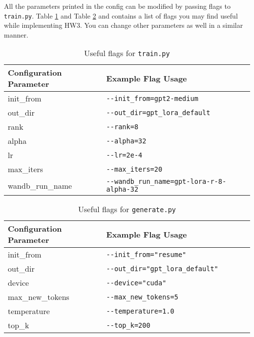 \documentclass[11pt,addpoints,answers]{exam}
\begin{document}
\begin{questions}
\begin{enumerate}
    
    
    

\end{enumerate}


All the parameters printed in the config can be modified by passing flags to \lstinline{train.py}. Table \ref{table:flag1} and Table \ref{table:flag2} and contains a list of flags you may find useful while implementing HW3. You can change other parameters as well in a similar manner.

\begin{table}[h!]
\centering
\begin{tabular}{|p{0.4\linewidth}|p{0.6\linewidth}|}
\hline
Configuration Parameter & Example Flag Usage \\ \hline
init\_from &  \lstinline|--init_from=gpt2-medium|  \\ \hline
out\_dir &  \lstinline|--out_dir=gpt_lora_default| \\ \hline
rank &  \lstinline|--rank=8|  \\ \hline
alpha &  \lstinline|--alpha=32|  \\ \hline
lr &  \lstinline|--lr=2e-4|  \\ \hline
max\_iters &  \lstinline|--max_iters=20| \\ \hline
wandb\_run\_name &  \lstinline|--wandb_run_name=gpt-lora-r-8-alpha-32| \\ \hline
\end{tabular}
\caption{Useful flags for \lstinline{train.py}}
\label{table:flag1}
\end{table}

\begin{table}[h!]
\centering
\begin{tabular}{|p{0.4\linewidth}|p{0.6\linewidth}|}
\hline
Configuration Parameter & Example Flag Usage \\ \hline
init\_from & \lstinline|--init_from="resume"| \\ \hline
out\_dir & \lstinline|--out_dir="gpt_lora_default"| \\ \hline
device & \lstinline|--device="cuda"| \\ \hline
max\_new\_tokens & \lstinline|--max_new_tokens=5| \\ \hline
temperature & \lstinline|--temperature=1.0| \\ \hline
top\_k & \lstinline|--top_k=200| \\ \hline
\end{tabular}
\caption{Useful flags for \lstinline{generate.py}}
\label{table:flag2}
\end{table}



\end{questions}
\end{document}
